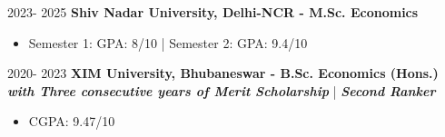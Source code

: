 \datedsubsection{ }
	{%
		2023- 2025}
	{%
		\textbf{Shiv Nadar University, Delhi-NCR - M.Sc. Economics}}
	{%
    \begin{itemize}
        \item Semester 1: GPA: 8/10 | Semester 2: GPA: 9.4/10
    \end{itemize}
  }

\datedsubsection{ }
	{%
		2020- 2023}
	{%
		\textbf{XIM University, Bhubaneswar - B.Sc. Economics (Hons.)}\\
  \hspace{0.5cm} \textbf{\textit{with Three consecutive years of Merit Scholarship}} | \textbf{\textit{Second Ranker}}}
	{%
    \begin{itemize}
        \item CGPA: 9.47/10
    \end{itemize}
  }
  